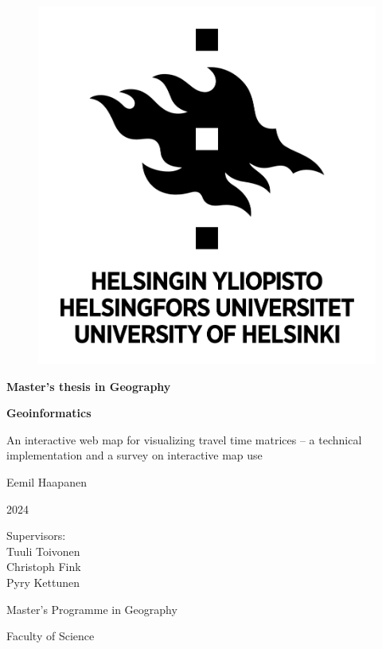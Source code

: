 \begin{center}{
    \begin{figure}[H]
        \centering
        \includegraphics[scale=0.4]{visual/other/helsinki_uni_logo.jpg}
    \end{figure}

    \bigskip
    \bigskip
    \bigskip
    \textbf{Master's thesis in Geography} \par
    \textbf{Geoinformatics} \par

    \bigskip
    \bigskip
    An interactive web map for visualizing travel time matrices --
    a technical implementation and a survey on interactive map use

    \bigskip
    \bigskip
    Eemil Haapanen

    2024

    \vfill

    Supervisors: \\
    Tuuli Toivonen \\
    Christoph Fink \\
    Pyry Kettunen \par
    \bigskip
    \bigskip
    \bigskip
    Master's Programme in Geography \par
    Faculty of Science \par
}
\end{center}
